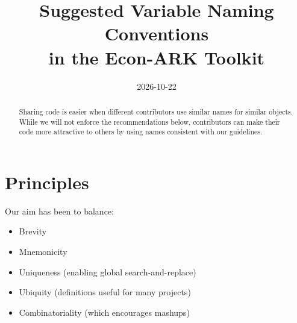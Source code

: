 \documentclass{econark}
\begin{document}
\newcommand{\texname}{NARK}

\title{Suggested Variable Naming Conventions \\ in the Econ-ARK Toolkit}

\date{2026-10-22} %
\vspace{2in}



\maketitle


\begin{abstract}
  Sharing code is easier when different contributors use similar names for similar objects.  While we will not enforce the
  recommendations below, contributors can make their code more attractive to others
  by using names consistent with our guidelines.
\end{abstract}




\pagebreak

\section{Principles}
Our aim has been to balance:
\begin{itemize}
\item Brevity
\item Mnemonicity
\item Uniqueness (enabling global search-and-replace)
\item Ubiquity (definitions useful for many projects)
\item Combinatoriality (which encourages mashups)
\end{itemize}
\end{document}
